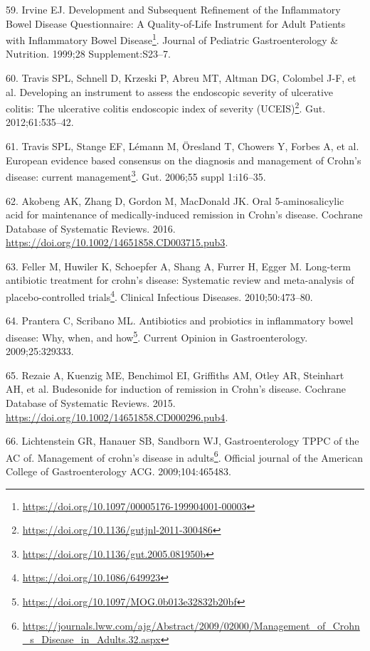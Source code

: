 \documentclass[
  a4paper,
]{book}
\DeclareRobustCommand{\href}[2]{#2\footnote{\url{#1}}}
\newlength{\cslhangindent}
\newlength{\cslentryspacingunit} %
\newenvironment{CSLReferences}[2] %
 {%
  \setlength{\parindent}{0pt}
  \ifodd #1
  \let\oldpar\par
  \def\par{\hangindent=\cslhangindent\oldpar}
  \fi
  \setlength{\parskip}{#2\cslentryspacingunit}
 }%
 {}
\begin{document}
\begin{CSLReferences}{0}{0}
\leavevmode{}%
59. Irvine EJ. \href{https://doi.org/10.1097/00005176-199904001-00003}{Development and Subsequent Refinement of the Inflammatory Bowel Disease Questionnaire: A Quality-of-Life Instrument for Adult Patients with Inflammatory Bowel Disease}. Journal of Pediatric Gastroenterology \& Nutrition. 1999;28 Supplement:S23--7.

\leavevmode{}%
60. Travis SPL, Schnell D, Krzeski P, Abreu MT, Altman DG, Colombel J-F, et al. \href{https://doi.org/10.1136/gutjnl-2011-300486}{Developing an instrument to assess the endoscopic severity of ulcerative colitis: The ulcerative colitis endoscopic index of severity (UCEIS)}. Gut. 2012;61:535--42.

\leavevmode{}%
61. Travis SPL, Stange EF, Lémann M, Öresland T, Chowers Y, Forbes A, et al. \href{https://doi.org/10.1136/gut.2005.081950b}{European evidence based consensus on the diagnosis and management of Crohn{'}s disease: current management}. Gut. 2006;55 suppl 1:i16--35.

\leavevmode{}%
62. Akobeng AK, Zhang D, Gordon M, MacDonald JK. Oral 5{-}aminosalicylic acid for maintenance of medically{-}induced remission in Crohn's disease. Cochrane Database of Systematic Reviews. 2016. \url{https://doi.org/10.1002/14651858.CD003715.pub3}.

\leavevmode{}%
63. Feller M, Huwiler K, Schoepfer A, Shang A, Furrer H, Egger M. \href{https://doi.org/10.1086/649923}{Long-term antibiotic treatment for crohn's disease: Systematic review and meta-analysis of placebo-controlled trials}. Clinical Infectious Diseases. 2010;50:473--80.

\leavevmode{}%
64. Prantera C, Scribano ML. \href{https://doi.org/10.1097/MOG.0b013e32832b20bf}{Antibiotics and probiotics in inflammatory bowel disease: Why, when, and how}. Current Opinion in Gastroenterology. 2009;25:329333.

\leavevmode{}%
65. Rezaie A, Kuenzig ME, Benchimol EI, Griffiths AM, Otley AR, Steinhart AH, et al. Budesonide for induction of remission in Crohn's disease. Cochrane Database of Systematic Reviews. 2015. \url{https://doi.org/10.1002/14651858.CD000296.pub4}.

\leavevmode{}%
66. Lichtenstein GR, Hanauer SB, Sandborn WJ, Gastroenterology TPPC of the AC of. \href{https://journals.lww.com/ajg/Abstract/2009/02000/Management_of_Crohn_s_Disease_in_Adults.32.aspx}{Management of crohn's disease in adults}. Official journal of the American College of Gastroenterology \textbar{} ACG. 2009;104:465483.


\end{CSLReferences}
\end{document}
